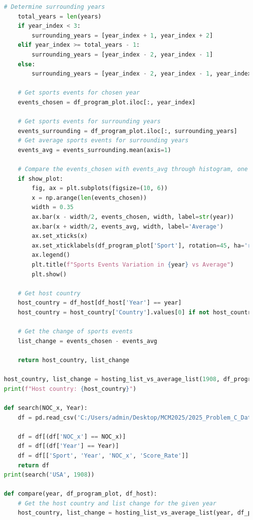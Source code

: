 \documentclass[12pt]{article}
\begin{document}
\begin{lstlisting}[language=Python, style=mystyle, caption=data\_analyze.ipynb]
    # Determine surrounding years
    total_years = len(years)
    if year_index < 3:
        surrounding_years = [year_index + 1, year_index + 2]
    elif year_index >= total_years - 1:
        surrounding_years = [year_index - 2, year_index - 1]
    else:
        surrounding_years = [year_index - 2, year_index - 1, year_index + 1, year_index + 2]

    # Get sports events for chosen year
    events_chosen = df_program_plot.iloc[:, year_index]

    # Get sports events for surrounding years
    events_surrounding = df_program_plot.iloc[:, surrounding_years]
    # Get average sports events for surrounding years
    events_avg = events_surrounding.mean(axis=1)

    # Compare the events_chosen with events_avg through histogram, one sport by another, with each names on x-axis,
    if show_plot:
        fig, ax = plt.subplots(figsize=(10, 6))
        x = np.arange(len(events_chosen))
        width = 0.35
        ax.bar(x - width/2, events_chosen, width, label=str(year))
        ax.bar(x + width/2, events_avg, width, label='Average')
        ax.set_xticks(x)
        ax.set_xticklabels(df_program_plot['Sport'], rotation=45, ha='right')
        ax.legend()
        plt.title(f"Sports Events Variation in {year} vs Average")
        plt.show()

    # Get host country
    host_country = df_host[df_host['Year'] == year]
    host_country = host_country['Country'].values[0] if not host_country.empty else 'Unknown'

    # Get the change of sports events
    list_change = events_chosen - events_avg

    return host_country, list_change

host_country, list_change = hosting_list_vs_average_list(1908, df_program_plot, df_host, show_plot=True)
print(f"Host country: {host_country}")

def search(NOC_x, Year):
    df = pd.read_csv('C:/Users/admin/Desktop/MCM2025/2025_Problem_C_Data/score_rate.csv')

    df = df[(df['NOC_x'] == NOC_x)]
    df = df[(df['Year'] == Year)]
    df = df[['Sport', 'Year', 'NOC_x', 'Score_Rate']]
    return df
print(search('USA', 1908))

def compare(year, df_program_plot, df_host):
    # Get the host country and list change for the given year
    host_country, list_change = hosting_list_vs_average_list(year, df_program_plot, df_host)
    

\end{lstlisting}
\end{document}
